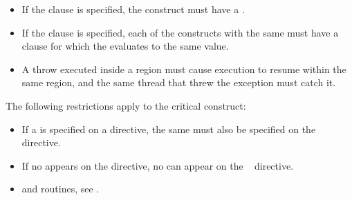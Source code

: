 {{{{%


\restrictions
\begin{itemize}
\item If the  clause is specified, the  
      construct must have a .
\item If the  clause is specified, each of the
   constructs with the same  must have a
   clause for which the  evaluates to the same
  value.

\end{itemize}

\cppspecificstart
\begin{itemize}
\item A throw executed inside a  region must cause execution to resume within 
the same  region, and the same thread that threw the exception must catch 
it.
\end{itemize}
\cppspecificend

\fortranspecificstart
The following restrictions apply to the critical construct:

\begin{itemize}
\item If a  is specified on a  directive, the same  must also be 
specified on the ~ directive. 

\item If no  appears on the  directive, no  can appear on the 
~ directive.
\end{itemize}
\fortranspecificend

\crossreferences
\begin{itemize}
\item {} and  routines, see .
\end{itemize}









}}}}
